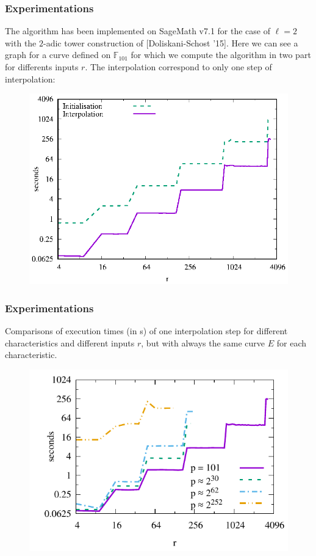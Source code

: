 \documentclass[10pt,a4paper]{beamer}
\theoremstyle{plain}
\theoremstyle{definition}
\theoremstyle{definition}
\theoremstyle{definition}
\theoremstyle{definition}
\theoremstyle{remark}
\theoremstyle{remark}
\begin{document}
\begin{frame}
\frametitle{Experimentations}
The algorithm has been implemented on SageMath v7.1 for the case of $\ell=2$ with the $2$-adic tower construction of [Doliskani-Schost '15].%
Here we can see a graph for a curve defined on $\mathbb{F}_{101}$ for which we compute the algorithm in two part for differents  inputs $r$. The interpolation correspond to only one step of interpolation:
\begin{figure}[hbtp]
\centering
\includegraphics[scale=0.7]{Images/graphe-101-bis.eps}
\end{figure}
\end{frame}


\begin{frame}
\frametitle{Experimentations}
Comparisons of execution times (in s) of one interpolation step for different characteristics and different inputs $r$, but with always the same curve $E$ for each characteristic.
\begin{figure}[hbtp]
\centering
\includegraphics[scale=0.8]{Images/graphe-101-149-269.pdf}
\end{figure}
\end{frame}
\end{document}
